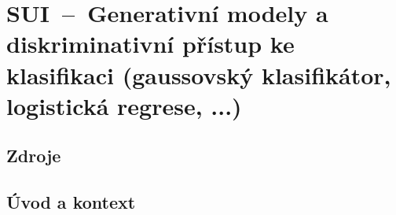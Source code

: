 

\graphicspath{{sui/klasifikace_generativni_diskriminativni/figures}}


\chapter{SUI~--~Generativní modely a diskriminativní přístup ke klasifikaci (gaussovský klasifikátor, logistická regrese, ...)}


\section{Zdroje}

\begin{compactitem}
    \item {}
    \item {}
    \item {}
\end{compactitem}


\section{Úvod a kontext}

